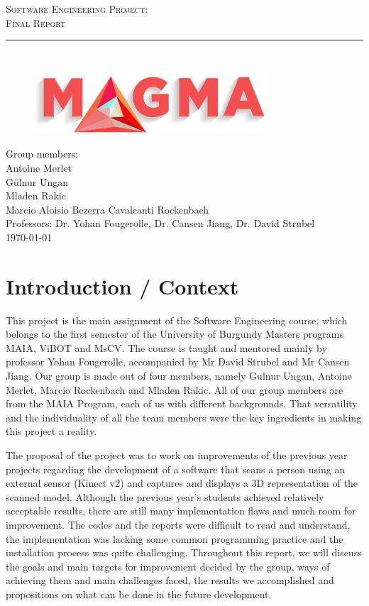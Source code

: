 \documentclass[aps,letterpaper,11pt]{revtex4}
\newcommand{\labno}{Software Engineering Project}
\newcommand{\labtitle}{Final Report}
\newcommand{\authorname}{Group members:\\Antoine Merlet\\Gülnur Ungan\\Mladen Rakic\\Marcio Aloisio Bezerra Cavalcanti Rockenbach}
\newcommand{\professor}{Dr. Yohan Fougerolle, Dr. Cansen Jiang, Dr. David Strubel}
\begin{document}
\begin{titlepage}
\begin{center}
{\LARGE \textsc{\labno:} \\ \vspace{4pt}}
{\Large \textsc{\labtitle} \\ \vspace{4pt}} 
\rule[13pt]{\textwidth}{1pt} \\ \vspace{150pt}
\begin{figure}[!htb]
  \includegraphics[scale=1.0]{logo.jpg}
\end{figure}
{\large \authorname \\ \vspace{10pt}
Professors: \professor \\ \vspace{10pt}
\today}
\end{center}


\end{titlepage}%
\newpage

\tableofcontents

\pagebreak
\setlength{\parindent}{10ex}
\setlength{\parskip}{1em}

\section{Introduction / Context}
This project is the main assignment of the Software Engineering course, which belongs to the first semester of the University of Burgundy Masters programs MAIA, ViBOT and MsCV. The course is taught and mentored mainly by professor Yohan Fougerolle, accompanied by Mr David Strubel and Mr Cansen Jiang. Our group is made out of four members, namely Gulnur Ungan, Antoine Merlet, Marcio Rockenbach and Mladen Rakic. All of our group members are from the MAIA Program, each of us with different backgrounds. That versatility and the individuality of all the team members were the key ingredients in making this project a reality.\par
The proposal of the project was to work on improvements of the previous year projects regarding the development of a software that scans a person using an external sensor (Kinect v2) and captures and displays a 3D representation of the scanned model. Although the previous year’s students achieved relatively acceptable results, there are still many implementation flaws and much room for improvement. The codes and the reports were difficult to read and understand, the implementation was lacking some common programming practice and the installation process was quite challenging. Throughout this report, we will discuss the goals and main targets for improvement decided by the group, ways of achieving them and main challenges faced, the results we accomplished and propositions on what can be done in the future development.\par
\pagebreak
\end{document}
